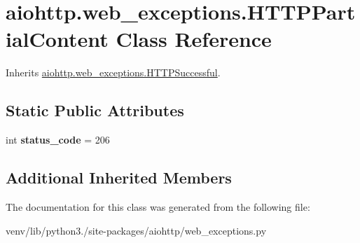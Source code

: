 \hypertarget{classaiohttp_1_1web__exceptions_1_1_h_t_t_p_partial_content}{}\section{aiohttp.\+web\+\_\+exceptions.\+H\+T\+T\+P\+Partial\+Content Class Reference}
\label{classaiohttp_1_1web__exceptions_1_1_h_t_t_p_partial_content}


Inherits \hyperlink{classaiohttp_1_1web__exceptions_1_1_h_t_t_p_successful}{aiohttp.\+web\+\_\+exceptions.\+H\+T\+T\+P\+Successful}.

\subsection*{Static Public Attributes}
\begin{DoxyCompactItemize}
\item 
\mbox{\label{classaiohttp_1_1web__exceptions_1_1_h_t_t_p_partial_content_a9f0dc60f712328c04cebfaed7aa7da84}} 
int {\bfseries status\+\_\+code} = 206
\end{DoxyCompactItemize}
\subsection*{Additional Inherited Members}


The documentation for this class was generated from the following file\+:\begin{DoxyCompactItemize}
\item 
venv/lib/python3./site-\/packages/aiohttp/web\+\_\+exceptions.\+py\end{DoxyCompactItemize}

